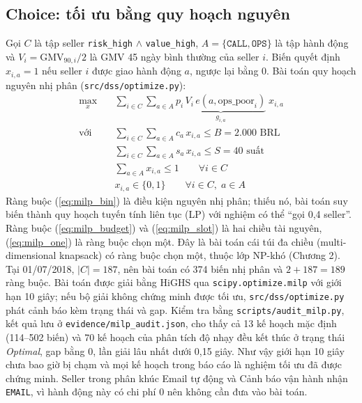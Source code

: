 \subsection{Choice: tối ưu bằng quy hoạch nguyên}
Gọi $C$ là tập seller \texttt{risk\_high} $\land$ \texttt{value\_high}, $A = \{\texttt{CALL}, \texttt{OPS}\}$ là tập hành động và $V_i = \text{GMV}_{90,i}/2$ là GMV 45 ngày bình thường của seller $i$. Biến quyết định $x_{i,a} = 1$ nếu seller $i$ được giao hành động $a$, ngược lại bằng 0. Bài toán quy hoạch nguyên nhị phân (\texttt{src/dss/optimize.py}):
\begin{align}
\max_{x} \quad & \sum_{i \in C} \sum_{a \in A} \underbrace{p_i \, V_i \, e(a, \text{ops\_poor}_i)}_{g_{i,a}} \; x_{i,a} \label{eq:milp_obj} \\
\text{với} \quad & \sum_{i \in C} \sum_{a \in A} c_a \, x_{i,a} \le B = 2.000 \text{ BRL} \label{eq:milp_budget} \\
& \sum_{i \in C} \sum_{a \in A} s_a \, x_{i,a} \le S = 40 \text{ suất} \label{eq:milp_slot} \\
& \sum_{a \in A} x_{i,a} \le 1 \qquad \forall i \in C \label{eq:milp_one} \\
& x_{i,a} \in \{0, 1\} \qquad \forall i \in C,\; a \in A \label{eq:milp_bin}
\end{align}
Ràng buộc (\ref{eq:milp_bin}) là điều kiện nguyên nhị phân; thiếu nó, bài toán suy biến thành quy hoạch tuyến tính liên tục (LP) với nghiệm có thể ``gọi 0,4 seller''. Ràng buộc (\ref{eq:milp_budget}) và (\ref{eq:milp_slot}) là hai chiều tài nguyên, (\ref{eq:milp_one}) là ràng buộc chọn một. Đây là bài toán cái túi đa chiều (multi-dimensional knapsack) có ràng buộc chọn một, thuộc lớp NP-khó (Chương 2). Tại 01/07/2018, $|C| = 187$, nên bài toán có 374 biến nhị phân và $2 + 187 = 189$ ràng buộc. Bài toán được giải bằng HiGHS qua \texttt{scipy.optimize.milp} với giới hạn 10 giây; nếu bộ giải không chứng minh được tối ưu, \texttt{src/dss/optimize.py} phát cảnh báo kèm trạng thái và gap. Kiểm tra bằng \texttt{scripts/audit\_milp.py}, kết quả lưu ở \texttt{evidence/}\allowbreak\texttt{milp\_audit.json}, cho thấy cả 13 kế hoạch mặc định (114--502 biến) và 70 kế hoạch của phân tích độ nhạy đều kết thúc ở trạng thái \emph{Optimal}, gap bằng 0, lần giải lâu nhất dưới 0,15 giây. Như vậy giới hạn 10 giây chưa bao giờ bị chạm và mọi kế hoạch trong báo cáo là nghiệm tối ưu đã được chứng minh. Seller trong phân khúc Email tự động và Cảnh báo vận hành nhận \texttt{EMAIL}, vì hành động này có chi phí 0 nên không cần đưa vào bài toán.

